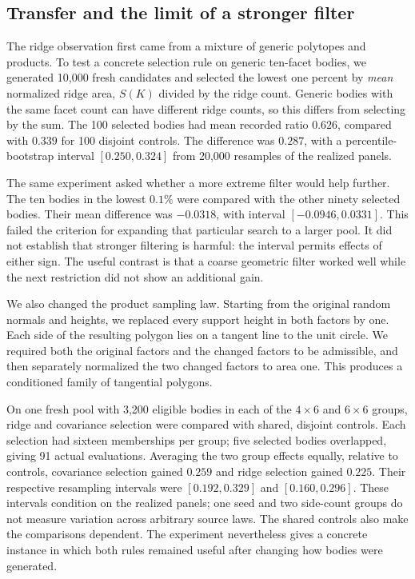 \subsection{Transfer and the limit of a stronger filter}

The ridge observation first came from a mixture of generic polytopes and
products. To test a concrete selection rule on generic ten-facet bodies, we
generated 10,000 fresh candidates and selected the lowest one percent by
\emph{mean} normalized ridge area, $S(K)$ divided by the ridge count.
Generic bodies with the same facet count can have different ridge counts,
so this differs from selecting by the sum. The 100 selected bodies had mean
recorded ratio $0.626$, compared with $0.339$ for 100 disjoint controls.
The difference was $0.287$, with a percentile-bootstrap interval
$[0.250,0.324]$ from 20,000 resamples of the realized panels.

The same experiment asked whether a more extreme filter would help further.
The ten bodies in the lowest $0.1\%$ were compared with the other ninety
selected bodies. Their mean difference was $-0.0318$, with interval
$[-0.0946,0.0331]$. This failed the criterion for expanding that particular
search to a larger pool. It did not establish that stronger filtering is
harmful: the interval permits effects of either sign. The useful contrast
is that a coarse geometric filter worked well while the next restriction
did not show an additional gain.

We also changed the product sampling law. Starting from the original random
normals and heights, we replaced every support height in both factors by
one. Each side of the resulting polygon lies on a tangent line to the unit
circle. We required both the original factors and the changed factors to
be admissible, and then separately normalized the two changed factors to
area one. This produces a conditioned family of tangential polygons.

On one fresh pool with 3,200 eligible bodies in each of the $4\times6$ and
$6\times6$ groups, ridge and covariance selection were compared with shared,
disjoint controls. Each selection had sixteen memberships per group; five
selected bodies overlapped, giving 91 actual evaluations. Averaging the two
group effects equally, relative to controls, covariance selection gained $0.259$
and ridge selection gained $0.225$. Their respective resampling intervals were
$[0.192,0.329]$ and $[0.160,0.296]$. These intervals condition on the realized
panels; one seed and two side-count groups do not measure variation across
arbitrary source laws. The shared controls also make the comparisons
dependent. The experiment nevertheless gives a concrete instance in which
both rules remained useful after changing how bodies were generated.

